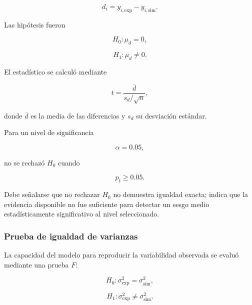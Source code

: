 \begin{equation}
d_i=y_{i,\mathrm{exp}}-y_{i,\mathrm{sim}}.
\end{equation}

Las hipótesis fueron

\begin{equation}
H_0:\mu_d=0,
\end{equation}

\begin{equation}
H_1:\mu_d\neq 0.
\end{equation}

El estadístico se calculó mediante

\begin{equation}
t
=
\frac{\overline{d}}
{s_d/\sqrt{n}},
\label{eq:t_pareada}
\end{equation}

donde $\overline{d}$ es la media de las diferencias y $s_d$ su desviación estándar.

Para un nivel de significancia

\begin{equation}
\alpha=0.05,
\end{equation}

no se rechazó $H_0$ cuando

\begin{equation}
p_t\geq 0.05.
\end{equation}

Debe señalarse que no rechazar $H_0$ no demuestra igualdad exacta; indica que la evidencia disponible no fue suficiente para detectar un sesgo medio estadísticamente significativo al nivel seleccionado.

\subsubsection{Prueba de igualdad de varianzas}
\label{subsubsec:f_test}

La capacidad del modelo para reproducir la variabilidad observada se evaluó mediante una prueba $F$:

\begin{equation}
H_0:
\sigma_{\mathrm{exp}}^2
=
\sigma_{\mathrm{sim}}^2,
\end{equation}

\begin{equation}
H_1:
\sigma_{\mathrm{exp}}^2
\neq
\sigma_{\mathrm{sim}}^2.
\end{equation}

